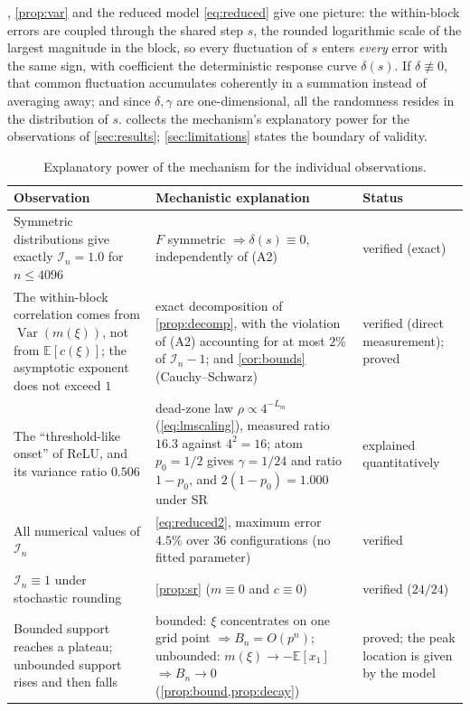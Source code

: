 \documentclass[twocolumn,review,hidelinks,oneeqnum,onetabnum,onefignum,onethmnum]{siamart251216}
\begin{document}
, \cref{prop:var} and the reduced model \cref{eq:reduced} give
one picture: the within-block errors are coupled through the shared step $s$, the
rounded logarithmic scale of the largest magnitude in the block, so every
fluctuation of $s$ enters \emph{every} error with the same sign, with coefficient
the deterministic response curve $\delta(s)$. If $\delta\not\equiv0$, that common
fluctuation accumulates coherently in a summation instead of averaging away; and
since $\delta,\gamma$ are one-dimensional, all the randomness resides in the
distribution of $s$.  collects the mechanism's explanatory power
for the observations of \cref{sec:results}; \cref{sec:limitations} states the
boundary of validity.

\begin{table}[!tb]
\centering
\caption{Explanatory power of the mechanism for the individual observations.}
\label{tab:explain}
\setlength{\tabcolsep}{4pt}
\footnotesize
\begin{tabular}{@{}p{}p{}p{}@{}}
\toprule
Observation & Mechanistic explanation & Status \\
\midrule
Symmetric distributions give exactly $\mathcal I_n=1.0$ for $n\le4096$ & $F$ symmetric $\Rightarrow\delta(s)\equiv0$, independently of (A2) & verified (exact) \\
The within-block correlation comes from $\operatorname{Var}(m(\xi))$, not from $\mathbb{E}[c(\xi)]$; the asymptotic exponent does not exceed $1$ & exact decomposition of \cref{prop:decomp}, with the violation of (A2) accounting for at most $2\%$ of $\mathcal I_n-1$; and \cref{cor:bounds} (Cauchy--Schwarz) & verified (direct measurement); proved \\
The ``threshold-like onset'' of ReLU, and its variance ratio $0.506$ & dead-zone law $\rho\propto4^{-L_m}$ (\cref{eq:lmscaling}), measured ratio $16.3$ against $4^2=16$; atom $p_0=1/2$ gives $\gamma=1/24$ and ratio $1-p_0$, and $2(1-p_0)=1.000$ under SR & explained quantitatively \\
All numerical values of $\mathcal I_n$ & \cref{eq:reduced2}, maximum error $4.5\%$ over $36$ configurations (no fitted parameter) & verified \\
$\mathcal I_n\equiv1$ under stochastic rounding & \cref{prop:sr} ($m\equiv0$ and $c\equiv0$) & verified ($24/24$) \\
Bounded support reaches a plateau; unbounded support rises and then falls & bounded: $\xi$ concentrates on one grid point $\Rightarrow B_n=O(p^n)$; unbounded: $m(\xi)\to-\mathbb E[x_1]$ $\Rightarrow B_n\to0$ (\cref{prop:bound,prop:decay}) & proved; the peak location is given by the model \\
\bottomrule
\end{tabular}
\end{table}
\end{document}
